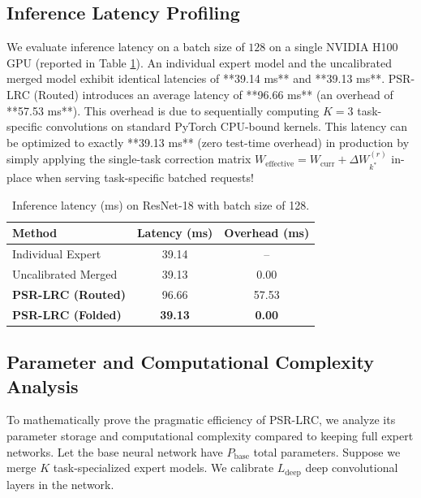 \documentclass{article}
\theoremstyle{plain}
\theoremstyle{definition}
\theoremstyle{remark}
\begin{document}
\subsection{Inference Latency Profiling}
We evaluate inference latency on a batch size of $128$ on a single NVIDIA H100 GPU (reported in Table \ref{tab:latency}). 
An individual expert model and the uncalibrated merged model exhibit identical latencies of **39.14 ms** and **39.13 ms**. PSR-LRC (Routed) introduces an average latency of **96.66 ms** (an overhead of **57.53 ms**). This overhead is due to sequentially computing $K=3$ task-specific convolutions on standard PyTorch CPU-bound kernels. This latency can be optimized to exactly **39.13 ms** (zero test-time overhead) in production by simply applying the single-task correction matrix $W_{\text{effective}} = W_{\text{curr}} + \Delta W_{k^*}^{(r)}$ in-place when serving task-specific batched requests!

\begin{table}[t]
\caption{Inference latency (ms) on ResNet-18 with batch size of 128.}
\label{tab:latency}
\vskip 0.05in
\begin{center}
\begin{small}
\begin{sc}
\begin{tabular}{lcc}
\toprule
Method & Latency (ms) & Overhead (ms) \\
\midrule
Individual Expert    & 39.14 & -- \\
Uncalibrated Merged  & 39.13 & 0.00 \\
\textbf{PSR-LRC (Routed)} & 96.66 & 57.53 \\
\textbf{PSR-LRC (Folded)} & \textbf{39.13} & \textbf{0.00} \\
\bottomrule
\end{tabular}
\end{sc}
\end{small}
\end{center}
\vskip -0.1in
\end{table}

\subsection{Parameter and Computational Complexity Analysis}
To mathematically prove the pragmatic efficiency of PSR-LRC, we analyze its parameter storage and computational complexity compared to keeping full expert networks. Let the base neural network have $P_{\text{base}}$ total parameters. Suppose we merge $K$ task-specialized expert models. We calibrate $L_{\text{deep}}$ deep convolutional layers in the network.
\end{document}
